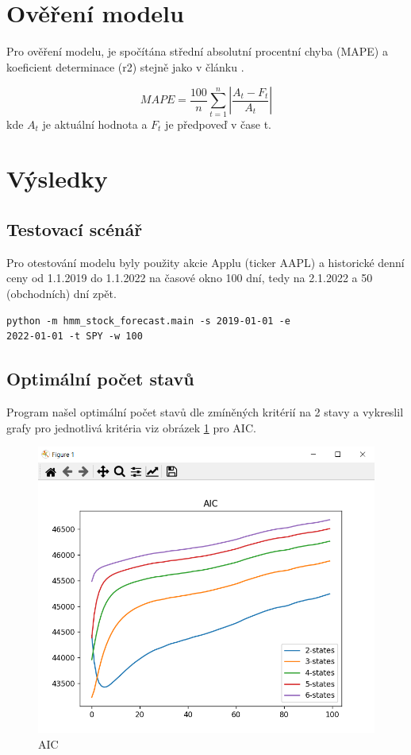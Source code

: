 \section{Ověření modelu}

Pro ověření modelu, je spočítána střední absolutní procentní chyba (MAPE) a koeficient determinace (r2) stejně jako v článku \cite{Hassan}.

\[ MAPE = \frac{100}{n}\displaystyle{\sum_{t=1}^{n} |\frac{A_t-F_t}{A_t}|} \]
kde \(A_t\) je aktuální hodnota a \(F_t\) je předpoveď v čase t.

\clearpage

\section{Výsledky}

\subsection{Testovací scénář}

Pro otestování modelu byly použity akcie Applu (ticker AAPL) a historické denní ceny od 1.1.2019 do 1.1.2022 na časové okno 100 dní, tedy na 2.1.2022 a 50 (obchodních) dní zpět.
\begin{lstlisting}
python -m hmm_stock_forecast.main -s 2019-01-01 -e
2022-01-01 -t SPY -w 100
\end{lstlisting}

\subsection{Optimální počet stavů}
Program našel optimální počet stavů dle zmíněných kritérií na 2 stavy a vykreslil grafy pro jednotlivá kritéria viz obrázek \ref{fig:aic} pro AIC.

\begin{figure}[h]
    \includegraphics[width=1\textwidth]{img/aic}
    \caption{AIC}
    \label{fig:aic}
\end{figure}

